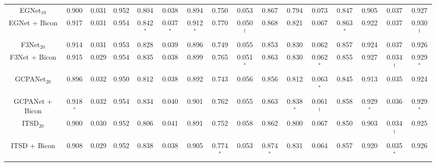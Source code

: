 \documentclass[final]{cvpr}
\begin{document}
\begin{table*}[h!]
{{\begin{tabular}{c ccc ccc ccc ccc ccc}
\cline{1-16}
{EGNet$_{19}$ \cite{egnet}}&0.900&0.031&0.952&0.804&0.038&0.894&0.750&0.053&0.867&0.794&0.073&0.847&0.905&0.037&0.927\\
{EGNet + Bicon}&\color{BrickRed}0.917&0.031&\color{BrickRed}0.954&\color{BrickRed}0.842\color{blue}$^\ast$&\color{BrickRed}0.037\color{blue}$^\ast$&\color{BrickRed}0.912\color{blue}$^\ast$&\color{BrickRed}0.770&\color{BrickRed}0.050\color{blue}$^\dagger$&\color{BrickRed}0.868&\color{BrickRed}0.821&\color{BrickRed}0.067&\color{BrickRed}0.863\color{blue}$^\ast$\color{BrickRed}&\color{BrickRed}0.922&0.037&\color{BrickRed}0.930\color{blue}$^\dagger$\\

\cline{1-16}
{F3Net$_{20}$ \cite{f3net}}&0.914&0.031&0.953&0.828&0.039&0.896&0.749&0.055&0.853&0.830&0.062&\color{BrickRed}0.857&0.924&0.037&0.926\\


{F3Net + Bicon}&\color{BrickRed}0.915&\color{BrickRed}0.029&\color{BrickRed}0.954&\color{BrickRed}0.835&\color{BrickRed}0.038&\color{BrickRed}0.899&\color{BrickRed}0.765&\color{BrickRed}0.051\color{blue}$^\ast$&\color{BrickRed}0.863&0.830&0.062\color{blue}$^\ast$&0.855&\color{BrickRed}0.927&\color{BrickRed}0.034\color{blue}$^\dagger$&\color{BrickRed}0.929\color{blue}$^\ast$\\



\cline{1-16}
{GCPANet$_{20}$ \cite{gcpa}}&0.896&0.032&0.950&0.812&\color{BrickRed}0.038&0.892&0.743&0.056&0.856&0.812&0.063\color{blue}$^\ast$&0.845&0.913&\color{BrickRed}0.035&0.924\\


{GCPANet + Bicon}&\color{BrickRed}0.918\color{blue}$^\ast$&0.032&\color{BrickRed}0.954&\color{BrickRed}0.834&0.040&\color{BrickRed}0.901&\color{BrickRed}0.762&\color{BrickRed}0.055&\color{BrickRed}0.863&\color{BrickRed}0.838\color{blue}$^\ast$&\color{BrickRed}0.061\color{blue}$^\dagger$&\color{BrickRed}0.858&\color{BrickRed}0.929\color{blue}$^\ast$&0.036&\color{BrickRed}0.929\color{blue}$^\ast$\\


\cline{1-16}
{ITSD$_{20}$ \cite{ITSD}}&0.900&0.030&0.952&0.806&0.041&0.891&0.752&0.058&0.862&0.800&0.067&0.850&0.903&\color{BrickRed}0.034\color{blue}$^\dagger$&0.925\\


{ITSD + Bicon}&\color{BrickRed}0.908&\color{BrickRed}0.029&0.952&\color{BrickRed}0.838&\color{BrickRed}0.038&\color{BrickRed}0.905&\color{BrickRed}0.774\color{blue}$^\ast$&\color{BrickRed}0.053&\color{BrickRed}0.874\color{blue}$^\ast$&\color{BrickRed}0.831&\color{BrickRed}0.064&\color{BrickRed}0.857&\color{BrickRed}0.920&0.035\color{blue}$^\ast$&\color{BrickRed}0.926\\
\cline{1-16}



\end{tabular}}}
\end{table*}
\end{document}
